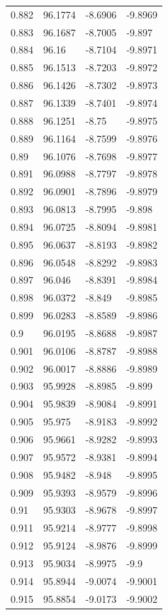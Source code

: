 \begin{tabular}{llll}
0.882 & 96.1774 & -8.6906 & -9.8969 \\
0.883 & 96.1687 & -8.7005 & -9.897 \\
0.884 & 96.16 & -8.7104 & -9.8971 \\
0.885 & 96.1513 & -8.7203 & -9.8972 \\
0.886 & 96.1426 & -8.7302 & -9.8973 \\
0.887 & 96.1339 & -8.7401 & -9.8974 \\
0.888 & 96.1251 & -8.75 & -9.8975 \\
0.889 & 96.1164 & -8.7599 & -9.8976 \\
0.89 & 96.1076 & -8.7698 & -9.8977 \\
0.891 & 96.0988 & -8.7797 & -9.8978 \\
0.892 & 96.0901 & -8.7896 & -9.8979 \\
0.893 & 96.0813 & -8.7995 & -9.898 \\
0.894 & 96.0725 & -8.8094 & -9.8981 \\
0.895 & 96.0637 & -8.8193 & -9.8982 \\
0.896 & 96.0548 & -8.8292 & -9.8983 \\
0.897 & 96.046 & -8.8391 & -9.8984 \\
0.898 & 96.0372 & -8.849 & -9.8985 \\
0.899 & 96.0283 & -8.8589 & -9.8986 \\
0.9 & 96.0195 & -8.8688 & -9.8987 \\
0.901 & 96.0106 & -8.8787 & -9.8988 \\
0.902 & 96.0017 & -8.8886 & -9.8989 \\
0.903 & 95.9928 & -8.8985 & -9.899 \\
0.904 & 95.9839 & -8.9084 & -9.8991 \\
0.905 & 95.975 & -8.9183 & -9.8992 \\
0.906 & 95.9661 & -8.9282 & -9.8993 \\
0.907 & 95.9572 & -8.9381 & -9.8994 \\
0.908 & 95.9482 & -8.948 & -9.8995 \\
0.909 & 95.9393 & -8.9579 & -9.8996 \\
0.91 & 95.9303 & -8.9678 & -9.8997 \\
0.911 & 95.9214 & -8.9777 & -9.8998 \\
0.912 & 95.9124 & -8.9876 & -9.8999 \\
0.913 & 95.9034 & -8.9975 & -9.9 \\
0.914 & 95.8944 & -9.0074 & -9.9001 \\
0.915 & 95.8854 & -9.0173 & -9.9002 \\

\end{tabular}
